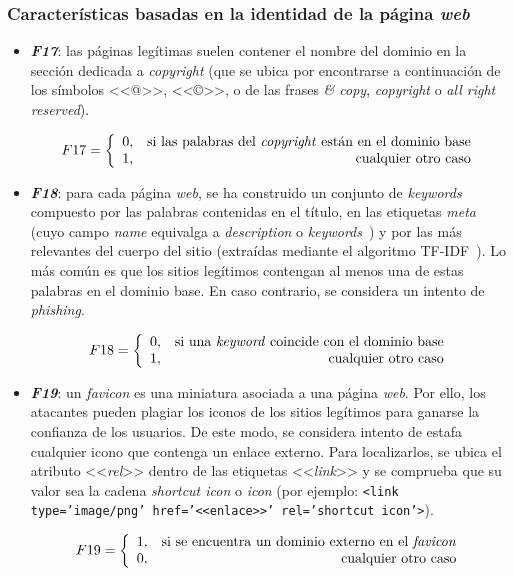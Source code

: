 \subsubsection{Características basadas en la identidad de la página \textit{web}}

\begin{itemize}
	\item \textit{\textbf{F17}}: las páginas legítimas suelen contener el nombre del dominio en la sección dedicada a \textit{copyright} (que se ubica por encontrarse a continuación de los símbolos <<@>>, <<©>>, o de las frases \textit{\& copy}, \textit{copyright} o \textit{all right reserved}).
	
	\[F17 = \left\{ \begin{array}{lr} 0, & \text{si las palabras del \textit{copyright} están en el dominio base}\\
		1, & \text{\raggedright cualquier otro caso} \label{eqn:phishing_f17} \end{array}\right.\]
	
	\item \textit{\textbf{F18}}: para cada página \textit{web}, se ha construido un conjunto de \textit{keywords} compuesto por las palabras contenidas en el título, en las etiquetas \textit{meta} (cuyo campo \textit{name} equivalga a \textit{description} o \textit{keywords}~\cite{metatags}) y por las más relevantes del cuerpo del sitio (extraídas mediante el algoritmo TF-IDF~\cite{cantinatfidf}). Lo más común es que los sitios legítimos contengan al menos una de estas palabras en el dominio base. En caso contrario, se considera un intento de \textit{phishing}.
	
	\[F18 = \left\{ \begin{array}{lr} 0, & \text{si una \textit{keyword} coincide con el dominio base}\\
		1, & \text{\raggedright cualquier otro caso} \label{eqn:phishing_f18} \end{array}\right.\]
	
	\item \textit{\textbf{F19}}: un \textit{favicon} es una miniatura asociada a una página \textit{web}. Por ello, los atacantes pueden plagiar los iconos de los sitios legítimos para ganarse la confianza de los usuarios. De este modo, se considera intento de estafa cualquier icono que contenga un enlace externo. Para localizarlos, se ubica el atributo <<\textit{rel}>> dentro de las etiquetas <<\textit{link}>> y se comprueba que su valor sea la cadena \textit{shortcut icon} o \textit{icon}  (por ejemplo: \texttt{<link type='image/png' href='<<enlace>>' rel='shortcut icon'>}).
	
	\[F19 = \left\{ \begin{array}{lr} 1, & \text{si se encuentra un dominio externo en el \textit{favicon}}\\
		0, & \text{\raggedright cualquier otro caso} \label{eqn:phishing_f19} \end{array}\right.\]
\end{itemize}





